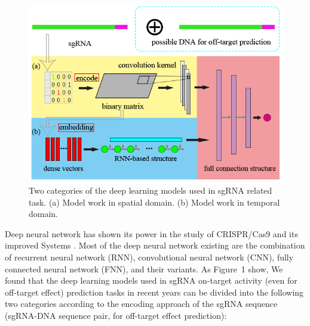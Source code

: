 \documentclass{bioinfo}
\begin{document}
\begin{figure}[!tpb]%
\centerline{\includegraphics[scale=0.45]{category.png}}
\caption{Two categories of the deep learning models used in sgRNA related task. 
(a) Model work in spatial domain. (b) Model work in temporal domain.}\label{fig:01}
\end{figure}
    
Deep neural network has shown its power in the study of CRISPR/Cas9 and its improved Systems \citep{liu2019computational}. 
 Most of the deep neural network existing are the combination of recurrent neural network (RNN), convolutional neural network (CNN), fully connected neural network (FNN), and their variants. 
 As Figure~1\vphantom{\ref{fig:01}} show,  
 We found that the deep learning models used in sgRNA on-target activity (even for off-target effect) prediction tasks in recent years can be divided into the following two categories according to the encoding approach of the sgRNA sequence (sgRNA-DNA sequence pair, for off-target effect prediction):
\end{document}
